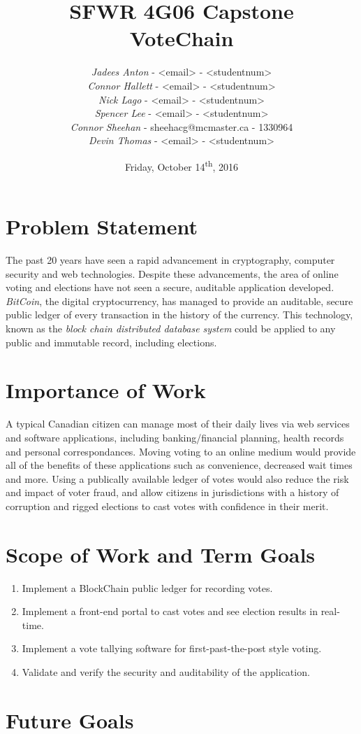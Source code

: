 \documentclass[titlepage]{article}
\title{\Huge{\textbf{
SFWR 4G06 Capstone\\VoteChain
}}\vspace{8cm}}
\author{\textit{Jadees Anton} - <email> - <studentnum>\\
\textit{Connor Hallett} - <email> - <studentnum>\\
\textit{Nick Lago} - <email> - <studentnum>\\
\textit{Spencer Lee} - <email> - <studentnum>\\
\textit{Connor Sheehan} - sheehacg@mcmaster.ca - 1330964\\
\textit{Devin Thomas} - <email> - <studentnum>
}
\date{Friday, October 14\textsuperscript{th}, 2016}
\begin{document}
\maketitle

\section{Problem Statement}
The past 20 years have seen a rapid advancement in cryptography, computer security and web technologies. Despite these advancements, the area of online voting and elections have not seen a secure, auditable application developed. \textit{BitCoin}, the digital cryptocurrency, has managed to provide an auditable, secure public ledger of every transaction in the history of the currency. This technology, known as the \textit{block chain distributed database system} could be applied to any public and immutable record, including elections.

\section{Importance of Work}
A typical Canadian citizen can manage most of their daily lives via web services and software applications, including banking/financial planning, health records and personal correspondances. Moving voting to an online medium would provide all of the benefits of these applications such as convenience, decreased wait times and more. Using a publically available ledger of votes would also reduce the risk and impact of voter fraud, and allow citizens in jurisdictions with a history of corruption and rigged elections to cast votes with confidence in their merit.

\section{Scope of Work and Term Goals}
\begin{enumerate}
\item Implement a BlockChain public ledger for recording votes.
\item Implement a front-end portal to cast votes and see election results in real-time.
\item Implement a vote tallying software for first-past-the-post style voting.
\item Validate and verify the security and auditability of the application.
\end{enumerate}

\section{Future Goals}
\end{document}
